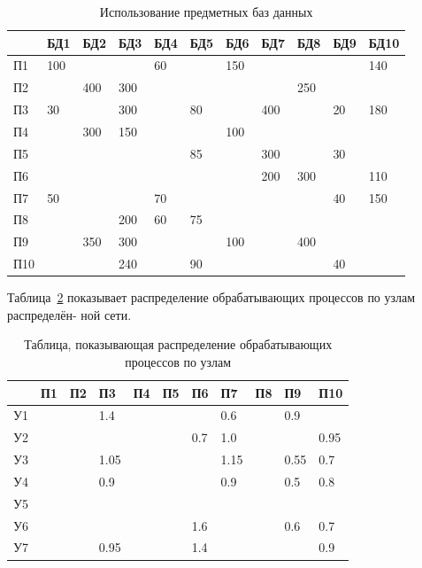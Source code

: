 \documentclass[russian,utf8,emptystyle]{eskdtext}
\begin{document}
\begin{longtable}{p{1cm}|p{1cm}|p{1cm}|p{1cm}|p{1cm}|p{1cm}|p{1cm}|p{1cm}|p{1cm}|p{1cm}|p{1cm}}
\caption{Использование предметных баз данных}
\label{tab:bd-1} \\
       & БД1 & БД2 & БД3 & БД4 & БД5 & БД6 & БД7 & БД8 & БД9 & БД10 \\
\hline
П1     & 100 &     &     & 60  &     & 150 &     &     &     & 140 \\
\hline
П2     &     & 400 & 300 &     &     &     &     & 250 &     &     \\
\hline
П3     & 30  &     & 300 &     & 80  &     & 400 &     & 20  & 180 \\
\hline
П4     &     & 300 & 150 &     &     & 100 &     &     &     &     \\
\hline
П5     &     &     &     &     & 85  &     & 300 &     & 30  &     \\
\hline
П6     &     &     &     &     &     &     & 200 & 300 &     & 110 \\
\hline
П7     & 50  &     &     & 70  &     &     &     &     & 40  & 150 \\
\hline
П8     &     &     & 200 & 60  & 75  &     &     &     &     &     \\
\hline
П9     &     & 350 & 300 &     &     & 100 &     & 400 &     &     \\
\hline
П10    &     &     & 240 &     & 90  &     &     &     & 40  &     \\
\end{longtable}

Таблица~\ref{tab:bd-2} показывает распределение обрабатывающих процессов по узлам распределён-
ной сети.

\begin{longtable}{p{1cm}|p{1cm}|p{1cm}|p{1cm}|p{1cm}|p{1cm}|p{1cm}|p{1cm}|p{1cm}|p{1cm}|p{1cm}}
\caption{Таблица, показывающая распределение обрабатывающих процессов по узлам}
\label{tab:bd-2} \\
       &  П1 &  П2 &  П3 &  П4 &  П5 &  П6 &  П7 &  П8 &  П9 &  П10 \\
\hline
У1     &     &     & 1.4 &     &     &     & 0.6 &     & 0.9 &     \\
\hline
У2     &     &     &     &     &     & 0.7 & 1.0 &     &     & 0.95\\
\hline
У3     &     &     & 1.05&     &     &     &1.15 &     & 0.55& 0.7 \\
\hline
У4     &     &     & 0.9 &     &     &     & 0.9 &     & 0.5 & 0.8 \\
\hline
У5     &     &     &     &     &     &     &     &     &     &     \\
\hline
У6     &     &     &     &     &     & 1.6 &     &     & 0.6 & 0.7 \\
\hline
У7     &     &     &0.95 &     &     & 1.4 &     &     &     & 0.9 \\
\end{longtable}
\end{document}
